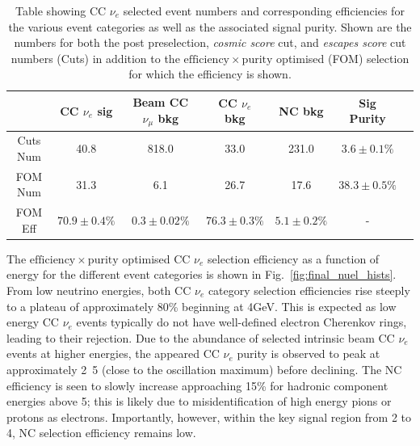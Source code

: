 \begin{table}
    \begin{tabular}{ccccccc}
                 & CC $\nu_{e}$ sig & Beam CC $\nu_{\mu}$ bkg & CC $\nu_{e}$ bkg & NC bkg        & Sig Purity     \\
        \midrule
        Cuts Num & 40.8             & 818.0                   & 33.0             & 231.0         & $3.6\pm0.1\%$  \\
        FOM Num  & 31.3             & 6.1                     & 26.7             & 17.6          & $38.3\pm0.5\%$ \\
        \midrule
        FOM Eff  & $70.9\pm0.4\%$   & $0.3\pm0.02\%$          & $76.3\pm0.3\%$   & $5.1\pm0.2\%$ & -              \\
    \end{tabular}
    \caption[Table showing CC $\nu_{e}$ selected event numbers, efficiencies and signal purity.]
    {Table showing CC $\nu_{e}$ selected event numbers and corresponding efficiencies for the
        various event categories as well as the associated signal purity. Shown are the numbers
        for both the post preselection, \emph{cosmic score} cut, and \emph{escapes score} cut
        numbers (Cuts) in addition to the $\mathrm{efficiency}\times\mathrm{purity}$ optimised
        (FOM) selection for which the efficiency is shown.}
    \label{tab:nuel_selection}
\end{table}

The $\mathrm{efficiency}\times\mathrm{purity}$ optimised CC $\nu_{e}$ selection efficiency as a
function of energy for the different event categories is shown in Fig.~\ref{fig:final_nuel_hists}.
From low neutrino energies, both CC $\nu_{e}$ category selection efficiencies rise steeply to a
plateau of approximately 80\% beginning at \unit{4}{GeV}. This is expected as low energy CC
$\nu_{e}$ events typically do not have well-defined electron Cherenkov rings, leading to their
rejection. Due to the abundance of selected intrinsic beam CC $\nu_{e}$ events at higher energies,
the appeared CC $\nu_{e}$ purity is observed to peak at approximately \unit{2.5}{\GeV} (close to
the oscillation maximum) before declining. The NC efficiency is seen to slowly increase
approaching 15\% for hadronic component energies above \unit{5}{\GeV}; this is likely due to
misidentification of high energy pions or protons as electrons. Importantly, however, within the
key signal region from 2 to \unit{4}{\GeV}, NC selection efficiency remains low.

